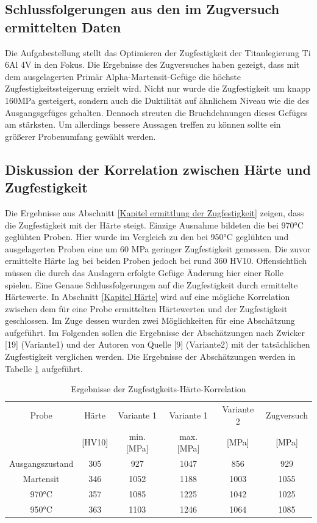 \documentclass[a4paper, 11pt]{tubsreprt}
\begin{document}
\subsection{Schlussfolgerungen aus den im Zugversuch ermittelten Daten}
 Die Aufgabestellung stellt das Optimieren der Zugfestigkeit der Titanlegierung Ti 6Al 4V in den Fokus. Die Ergebnisse des Zugversuches haben gezeigt, dass mit dem ausgelagerten Primär Alpha-Martensit-Gefüge die höchste Zugfestigkeitssteigerung erzielt wird. Nicht nur wurde die Zugfestigkeit um knapp 160MPa gesteigert, sondern auch die Duktilität auf ähnlichem Niveau wie die des Ausgangsgefüges gehalten. Dennoch streuten die Bruchdehnungen dieses Gefüges am stärksten. Um allerdings bessere Aussagen treffen zu können sollte ein größerer Probenumfang gewählt werden.
\subsection{Diskussion der Korrelation zwischen Härte und Zugfestigkeit}
Die Ergebnisse aus Abschnitt \ref{Kapitel ermittlung der Zugfestigkeit} zeigen, dass die Zugfestigkeit mit der Härte steigt. Einzige Ausnahme bildeten die bei 970°C geglühten Proben. Hier wurde im Vergleich zu den bei 950°C geglühten und ausgelagerten Proben eine um 60 MPa geringer Zugfestigkeit gemessen. Die zuvor ermittelte Härte lag bei beiden Proben jedoch bei rund 360 HV10. Offensichtlich müssen die durch das Auslagern erfolgte Gefüge Änderung hier einer Rolle spielen. Eine Genaue Schlussfolgerungen auf die Zugfestigkeit durch ermittelte Härtewerte.
In Abschnitt \ref{Kapitel Härte} wird auf eine mögliche Korrelation zwischen dem für eine Probe ermittelten Härtewerten und der Zugfestigkeit geschlossen. Im Zuge dessen wurden zwei Möglichkeiten für eine Abschätzung aufgeführt. Im Folgenden sollen die Ergebnisse der Abschätzungen nach Zwicker [19] (Variante1) und der Autoren von Quelle [9] (Variante2) mit der tatsächlichen Zugfestigkeit verglichen werden. 
Die Ergebnisse der Abschätzungen werden in Tabelle \ref{Tabelle Zugfestigkeits härte korrelation} aufgeführt.
\begin{table}
\begin{tabular}{c|c|c|c|c|c}
Probe & Härte  & Variante 1  & Variante 1  & Variante 2 & Zugversuch  \\
& [HV10] & min. [MPa] & max. [MPa] & [MPa] & [MPa]\\
\hline
Ausgangszustand & 305 & 927 & 1047 & 856 & 929 \\
\hline
Martensit & 346 & 1052 & 1188 & 1003 & 1055 \\
\hline
970°C & 357 & 1085 & 1225 & 1042 & 1025 \\
\hline
950°C & 363 & 1103 & 1246& 1064 & 1085 \\
\end{tabular}
\caption{Ergebnisse der Zugfestgkeits-Härte-Korrelation}
\label{Tabelle Zugfestigkeits härte korrelation}
\end{table}
\end{document}
